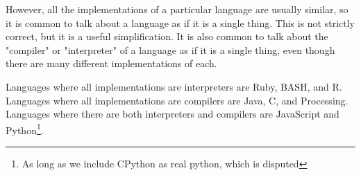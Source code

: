 \documentclass[twoside=false, DIV=14]{scrartcl}
\begin{document}
However, all the implementations of a particular language are usually similar, so it is common to talk about a language as if it is a single thing.  This is not strictly correct, but it is a useful simplification.  It is also common to talk about the "compiler" or "interpreter" of a language as if it is a single thing, even though there are many different implementations of each.

Languages where all implementations are interpreters are Ruby, BASH, and R.  Languages where all implementations are compilers are Java, C, and Processing.  Languages where there are both interpreters and compilers are JavaScript and Python\footnote{As long as we include CPython as real python, which is disputed}.
\end{document}

